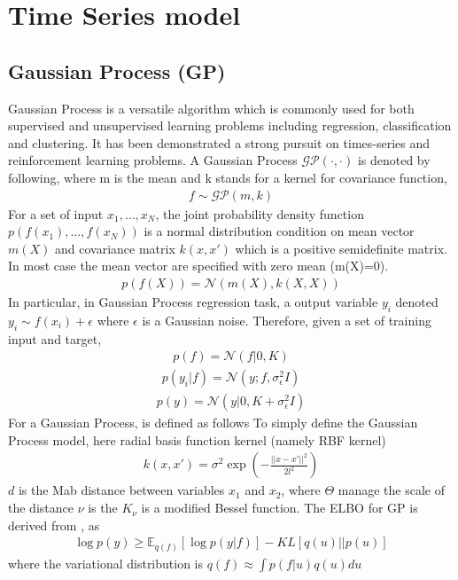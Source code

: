 \section{Time Series model}
\subsection{Gaussian Process (GP)}
Gaussian Process is a versatile algorithm which is commonly used for both supervised and unsupervised learning problems including regression, classification and clustering. It has been demonstrated a strong pursuit on times-series and reinforcement learning problems. A Gaussian Process $ \mathcal{GP}(\cdot,\cdot) $ is denoted by following, where m is the mean and k stands for a kernel for covariance function,
\begin{align*}
f\sim\mathcal{GP}(m,k)
\end{align*}
For a set of input $ x_1,\dots,x_N $, the joint probability density function $ p(f(x_1),\dots,f(x_N)) $ is a normal distribution condition on mean vector $ m(X) $ and covariance matrix $ k(x,x') $ which is a positive semidefinite matrix. In most case the mean vector are specified with zero mean (m(X)=0).
\begin{align*}
p(f(X))=\mathcal{N}(m(X),k(X,X))
\end{align*}
In particular, in Gaussian Process regression task, a output variable $ y_i $ denoted $ y_i\sim f(x_i)+\epsilon $ where $ \epsilon $ is a Gaussian noise. Therefore, given a set of training input and target, 
\begin{align*}
p(f)=\mathcal{N}(f|0,K)
\end{align*}
\begin{align*}
p(y_i|f)=\mathcal{N}(y;f,\sigma_\epsilon^2I)
\end{align*}
\begin{align*}
p(y)=\mathcal{N}(y|0,K+\sigma_\epsilon^2I)
\end{align*}
For a Gaussian Process, is defined as follows
To simply define the Gaussian Process model, here 
radial basis function kernel (namely RBF kernel)
\begin{align*}
k(x,x')=\sigma^2\exp\left(-\frac{||x-x'||^2}{2l^2}\right)
\end{align*}
$ d $ is the Mab distance between variables $ x_1 $ and $ x_2 $, where $ \Theta $ manage the scale of the distance
$ \nu $ is the 
$ K_\nu $ is a modified Bessel function.
The ELBO for GP is derived from \cite{hensman_gaussian_nodate}, as
\begin{align*}
\log p(y)\geq\mathbb{E}_{q(f)}[\log p(y|f)]-KL[q(u)||p(u)]
\end{align*}
where the variational distribution is $ q(f)\approx\int p(f|u)q(u)du $
